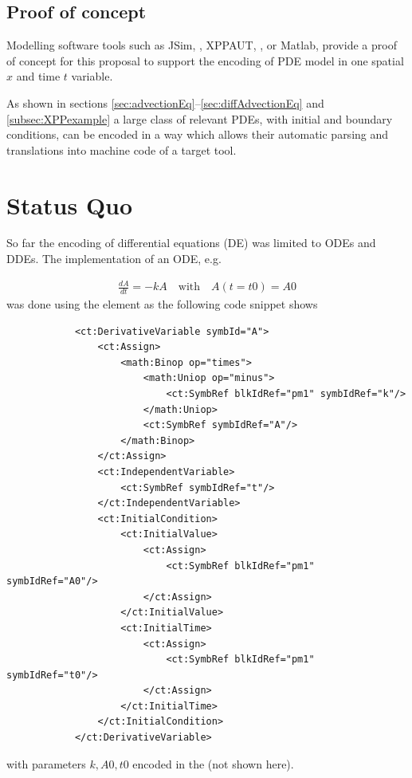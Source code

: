 \subsection{Proof of concept}
Modelling software tools such as JSim, \cite{Raymond:2003ys}, 
XPPAUT, \cite{ermentrout2002simulating}, or Matlab,
provide a proof of concept for this proposal to support the encoding of PDE 
model in one spatial  $x$ and time $t$ variable.

As shown in sections \ref{sec:advectionEq}--\ref{sec:diffAdvectionEq} and 
\ref{subsec:XPPexample} a large class of relevant PDEs, with initial and 
boundary conditions, can be encoded in a way which allows their 
automatic parsing and translations into machine code of a target tool.


\section{Status Quo}
So far the encoding of differential equations (DE) was limited to ODEs and DDEs.
The implementation of an ODE, e.g.

\begin{align}
\frac{dA}{dt}  = -k A\quad \text{with} \quad A(t\!=\!t0)\!=\!A0 \nonumber
\end{align}
was done using the  element as the following 
code snippet shows

\lstset{language=XML}
\begin{lstlisting}
            <ct:DerivativeVariable symbId="A">
                <ct:Assign>
                    <math:Binop op="times">
                        <math:Uniop op="minus">
                            <ct:SymbRef blkIdRef="pm1" symbIdRef="k"/>
                        </math:Uniop>
                        <ct:SymbRef symbIdRef="A"/>
                    </math:Binop>
                </ct:Assign>
                <ct:IndependentVariable>
                    <ct:SymbRef symbIdRef="t"/>
                </ct:IndependentVariable>
                <ct:InitialCondition>
                    <ct:InitialValue>
                        <ct:Assign>
                            <ct:SymbRef blkIdRef="pm1" symbIdRef="A0"/>
                        </ct:Assign>
                    </ct:InitialValue>
                    <ct:InitialTime>
                        <ct:Assign>
                            <ct:SymbRef blkIdRef="pm1" symbIdRef="t0"/>
                        </ct:Assign>
                    </ct:InitialTime>
                </ct:InitialCondition>
            </ct:DerivativeVariable>
\end{lstlisting}
with parameters $k, A0, t0$ encoded in the  (not shown here).

